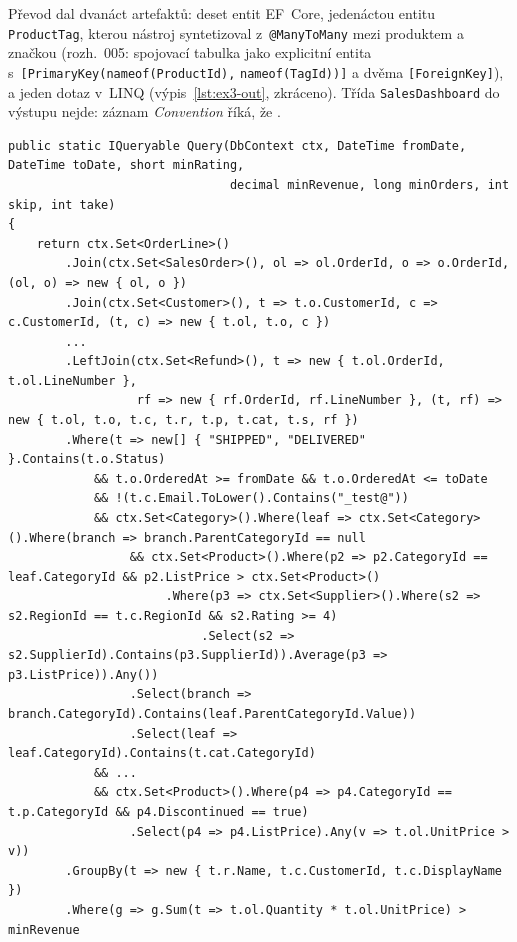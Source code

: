 \documentclass{article}
\begin{document}
Převod dal dvanáct artefaktů: deset entit EF~Core, jedenáctou entitu \texttt{ProductTag}, kterou nástroj syntetizoval z~\texttt{@ManyToMany} mezi produktem a značkou (rozh.~005: spojovací tabulka jako explicitní entita s~\texttt{[PrimaryKey(nameof(ProductId),} \texttt{nameof(TagId))]} a dvěma \texttt{[ForeignKey]}), a jeden dotaz v~LINQ (výpis~\ref{lst:ex3-out}, zkráceno). Třída \texttt{SalesDashboard} do výstupu nejde: záznam \emph{Convention} říká, že .

\begin{lstlisting}[language={[Sharp]C},caption={Příklad 3, výstup (výňatek): metoda dotazu v~LINQ pro EF Core.},label={lst:ex3-out}]
public static IQueryable Query(DbContext ctx, DateTime fromDate, DateTime toDate, short minRating,
                               decimal minRevenue, long minOrders, int skip, int take)
{
    return ctx.Set<OrderLine>()
        .Join(ctx.Set<SalesOrder>(), ol => ol.OrderId, o => o.OrderId, (ol, o) => new { ol, o })
        .Join(ctx.Set<Customer>(), t => t.o.CustomerId, c => c.CustomerId, (t, c) => new { t.ol, t.o, c })
        ...
        .LeftJoin(ctx.Set<Refund>(), t => new { t.ol.OrderId, t.ol.LineNumber },
                  rf => new { rf.OrderId, rf.LineNumber }, (t, rf) => new { t.ol, t.o, t.c, t.r, t.p, t.cat, t.s, rf })
        .Where(t => new[] { "SHIPPED", "DELIVERED" }.Contains(t.o.Status)
            && t.o.OrderedAt >= fromDate && t.o.OrderedAt <= toDate
            && !(t.c.Email.ToLower().Contains("_test@"))
            && ctx.Set<Category>().Where(leaf => ctx.Set<Category>().Where(branch => branch.ParentCategoryId == null
                 && ctx.Set<Product>().Where(p2 => p2.CategoryId == leaf.CategoryId && p2.ListPrice > ctx.Set<Product>()
                      .Where(p3 => ctx.Set<Supplier>().Where(s2 => s2.RegionId == t.c.RegionId && s2.Rating >= 4)
                           .Select(s2 => s2.SupplierId).Contains(p3.SupplierId)).Average(p3 => p3.ListPrice)).Any())
                 .Select(branch => branch.CategoryId).Contains(leaf.ParentCategoryId.Value))
                 .Select(leaf => leaf.CategoryId).Contains(t.cat.CategoryId)
            && ...
            && ctx.Set<Product>().Where(p4 => p4.CategoryId == t.p.CategoryId && p4.Discontinued == true)
                 .Select(p4 => p4.ListPrice).Any(v => t.ol.UnitPrice > v))
        .GroupBy(t => new { t.r.Name, t.c.CustomerId, t.c.DisplayName })
        .Where(g => g.Sum(t => t.ol.Quantity * t.ol.UnitPrice) > minRevenue

\end{lstlisting}
\end{document}
